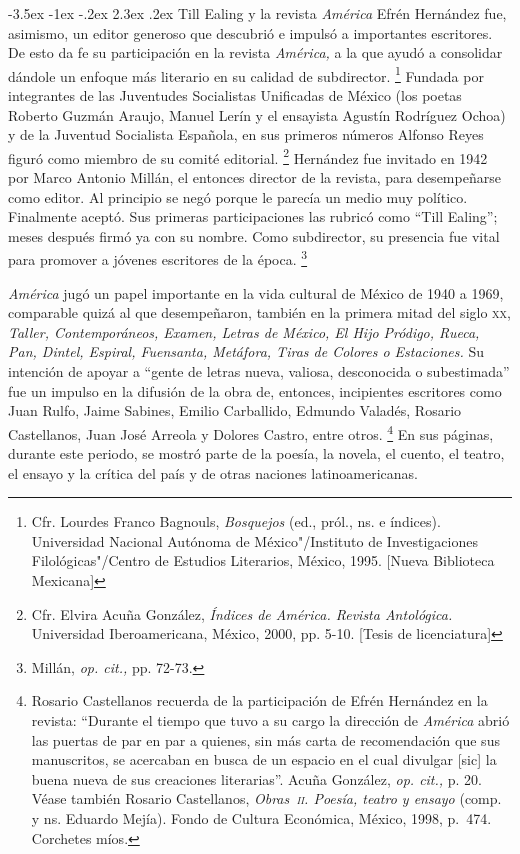 \documentclass[14pt,twoside,final]{extbook} %
\makeatletter
\let\oldfootnote\footnote
\renewcommand\footnote[1]{%
\oldfootnote{\hspace{1mm}#1}}
\renewcommand\section{\@startsection {section}{1}{\z@}%
                                     {-3.5ex \@plus -1ex \@minus -.2ex}%
                                     {2.3ex \@plus .2ex}%
                                     {\normalfont\large\bfseries\sc}}
\makeatother
\begin{document}
\section{Till Ealing y la revista \emph{América}}\label{sec:till-ealing-y-la-revista-america}\protect\enlargethispage*{\baselineskip}
Efrén Hernández fue, asimismo, un editor generoso que descubrió e impulsó a importantes escritores. De esto da fe su participación en la revista \emph{América,} a la que ayudó a consolidar dándole un enfoque más literario en su calidad de subdirector.\footnote{Cfr. Lourdes Franco Bagnouls, \emph{Bosquejos} (ed., pról., ns. e índices). Universidad Nacional Autónoma de México"/Instituto de Investigaciones Filológicas"/Centro de Estudios Literarios, México, 1995. [Nueva Biblioteca Mexicana]} Fundada por integrantes de las Juventudes Socialistas Unificadas de México (los poetas Roberto Guzmán Araujo, Manuel Lerín y el ensayista Agustín Rodríguez Ochoa) y de la Juventud Socialista Española, en sus primeros números Alfonso Reyes figuró como miembro de su comité editorial.\footnote{Cfr. Elvira Acuña González, \emph{Índices de \emph{América. Revista Antológica}.} Universidad Iberoamericana, México, 2000, pp. 5-10. [Tesis de licenciatura]} Hernández fue invitado en 1942 por Marco Antonio Millán, el entonces director de la revista, para desempeñarse como editor. Al principio se negó porque le parecía un medio muy político. Finalmente aceptó. Sus primeras participaciones las rubricó como ``Till Ealing''; meses después firmó ya con su nombre. Como subdirector, su presencia fue vital para promover a jóvenes escritores de la época.\footnote{Millán, \emph{op. cit.,} pp. 72-73.}

\emph{América} jugó un papel importante en la vida cultural de México de 1940 a 1969, comparable quizá al que desempeñaron, también en la primera mitad del siglo \textsc{xx}, \textit{Taller, Contemporáneos, Examen, Letras de México, El Hijo Pródigo, Rueca, Pan, Dintel, Espiral, Fuensanta, Metáfora, Tiras de Colores \emph{o} Estaciones.} Su intención de apoyar a ``gente de letras nueva, valiosa, desconocida o subestimada'' fue un impulso en la difusión de la obra de, entonces, incipientes escritores como Juan Rulfo, Jaime Sabines, Emilio Carballido, Edmundo Valadés, Rosario Castellanos, Juan José Arreola y Dolores Castro, entre otros.\footnote{Rosario Castellanos recuerda de la participación de Efrén Hernández en la revista: ``Durante el tiempo que tuvo a su cargo la dirección de \emph{América} abrió las puertas de par en par a quienes, sin más carta de recomendación que sus manuscritos, se acercaban en busca de un espacio en el cual divulgar [sic] la buena nueva de sus creaciones literarias''. Acuña González, \emph{op. cit.,} p. 20. Véase también Rosario Castellanos, \emph{Obras~\textsc{ii}. Poesía, teatro y ensayo} (comp. y ns. Eduardo Mejía). Fondo de Cultura Económica, México, 1998, p.~474. Corchetes míos.} En sus páginas, durante este periodo, se mostró parte de la poesía, la novela, el cuento, el teatro, el ensayo y la crítica del país y de otras naciones latinoamericanas.\protect\enlargethispage*{\baselineskip}
\end{document}
